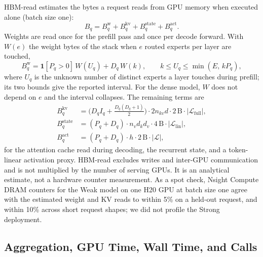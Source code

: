 \documentclass[11pt, copyright, logo, secondlogo]{template/lark}
\begin{document}
HBM-read estimates the bytes a request reads from GPU memory when executed
alone (batch size one):
\begin{equation}
B_q=B^{\mathrm{w}}_q+B^{\mathrm{kv}}_q+B^{\mathrm{state}}_q+B^{\mathrm{act}}_q.
\label{eq:hbm_request}
\end{equation}
Weights are read once for the prefill pass and once per decode forward. With
$W(e)$ the weight bytes of the stack when $e$ routed experts per layer are
touched,
\begin{equation}
B^{\mathrm{w}}_q=\mathbf{1}[P_q>0]\,W(U_q)+D_q\,W(k),\qquad
k\le U_q\le\min(E,\,kP_q),
\label{eq:hbm_weights}
\end{equation}
where $U_q$ is the unknown number of distinct experts a layer touches during
prefill; its two bounds give the reported interval. For the dense model,
$W$ does not depend on $e$ and the interval collapses. The remaining terms are
\begin{align}
B^{\mathrm{kv}}_q&=\bigl(D_qI_q+\tfrac{D_q(D_q+1)}{2}\bigr)\cdot 2n_{kv}d\cdot 2\,\mathrm{B}\cdot|\mathcal L_{\mathrm{full}}|,\\
B^{\mathrm{state}}_q&=(P_q+D_q)\cdot n_vd_kd_v\cdot 4\,\mathrm{B}\cdot|\mathcal L_{\mathrm{lin}}|,\\
B^{\mathrm{act}}_q&=(P_q+D_q)\cdot h\cdot 2\,\mathrm{B}\cdot|\mathcal L|,
\end{align}
for the attention cache read during decoding, the recurrent state, and a
token-linear activation proxy. HBM-read excludes writes and inter-GPU
communication and is not multiplied by the number of serving GPUs. It is an
analytical estimate, not a hardware counter measurement. As a spot check,
Nsight Compute DRAM counters for the Weak model on one H20 GPU at batch size
one agree with the estimated weight and KV reads to within 5\% on a held-out
request, and within 10\% across short request shapes; we did not profile the
Strong deployment.

\subsection{Aggregation, GPU Time, Wall Time, and Calls}
\label{sec:appendix_aggregation}
\end{document}
